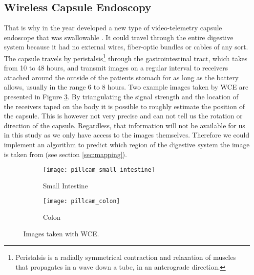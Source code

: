 \documentclass[thesis.tex]{subfiles}
\begin{document}
\subsection{Wireless Capsule Endoscopy}  \label{sec:wireless_capsule_endoscopy}
That is why in the year \citeyear{WirelessCapsule00} \citeauthor*{WirelessCapsule00} developed a new type of video-telemetry capsule endoscope that was swallowable \cite{WirelessCapsule00}. It could travel through the entire digestive system because it had no external wires, fiber-optic bundles or cables of any sort. The capsule travels by peristalsis\footnote{Peristalsis is a radially symmetrical contraction and relaxation of muscles that propagates in a wave down a tube, in an anterograde direction.} through the gastrointestinal tract, which takes from 10 to 48 hours, and transmit images on a regular interval to receivers attached around the outside of the patients stomach for as long as the battery allows, usually in the range 6 to 8 hours. Two example images taken by WCE are presented in Figure \ref{fig:pillcam_examples}. By triangulating the signal strength and the location of the receivers taped on the body it is possible to roughly estimate the position of the capsule. This is however not very precise and can not tell us the rotation or direction of the capsule. Regardless, that information will not be available for us in this study as we only have access to the images themselves. Therefore we could implement an algorithm to predict which region of the digestive system the image is taken from (see section \ref{sec:mapping}).


\begin{figure} %
  \centering
  \begin{subfigure}[b]{0.4\linewidth}%
    \centering
    \texttt{[image: pillcam\_small\_intestine]}%
    \caption{Small Intestine}%
    \label{fig:pillcam_small_intestine}%
  \end{subfigure}%
  \quad
  \begin{subfigure}[b]{0.4\linewidth}%
    \centering
    \texttt{[image: pillcam\_colon]}%
    \caption{Colon}%
    \label{fig:pillcam_colon}%
  \end{subfigure}%
  \caption[Images taken with WCE]{Images taken with WCE\footnotemark.}%
  \label{fig:pillcam_examples}%
\end{figure}%
\end{document}

